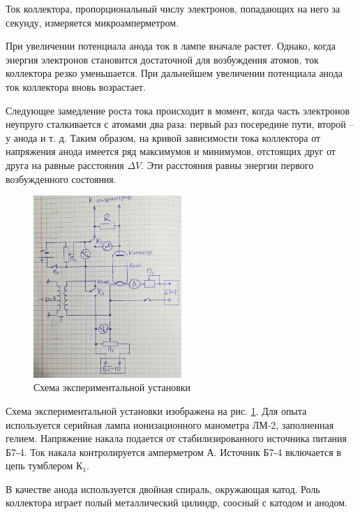 	Ток коллектора, пропорциональный числу электронов, попадающих на него за секунду, измеряется микроамперметром.

	
	При увеличении потенциала анода ток в лампе вначале растет. Однако, когда энергия электронов становится достаточной для возбуждения атомов, ток коллектора резко уменьшается. При дальнейшем увеличении потенциала анода ток коллектора вновь возрастает.

	
	Следующее замедление роста тока происходит в момент, когда часть
	электронов неупруго сталкивается с атомами два раза: первый раз посередине пути, второй -- у анода и т. д. Таким образом, на кривой зависимости тока коллектора от напряжения анода имеется ряд максимумов и минимумов, отстоящих друг от друга на равные расстояния $\Delta V$. Эти расстояния равны энергии первого возбужденного состояния.
	
	
	\begin{figure}
		\includegraphics[width=0.5\textwidth]{./Pictures/Circuit.jpg}
		\caption{Схема экспериментальной установки}
		\label{Circuit}
	\end{figure}

	
	Схема экспериментальной установки изображена на рис. \ref{Circuit}. Для опыта используется серийная лампа ионизационного манометра ЛМ-2, заполненная гелием. Напряжение накала подается от стабилизированного источника питания Б7-4. Ток накала контролируется амперметром А. Источник Б7-4 включается в цепь тумблером К$_1$.
	
	В качестве анода используется двойная спираль, окружающая катод. Роль коллектора играет полый металлический цилиндр, соосный с катодом и анодом.
	
